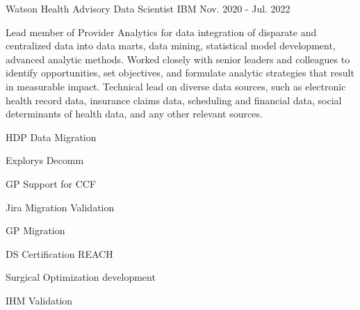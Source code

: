 \begin{cventries}
  \cventry
    {Watson Health} %
    {Advisory Data Scientist}
    {IBM}
    {Nov. 2020 - Jul. 2022}
    {
      \begin{cvparagraph}
        Lead member of Provider Analytics for data integration of disparate and centralized data into data marts, data mining, statistical model development, advanced analytic methods.  Worked closely with senior leaders and colleagues to identify opportunities, set objectives, and formulate analytic strategies that result in measurable impact.  Technical lead on diverse data sources, such as electronic health record data, insurance claims data, scheduling and financial data, social determinants of health data, and any other relevant sources.
      \end{cvparagraph}
      \begin{cvitems} %
        \item {HDP Data Migration}
        \item {Explorys Decomm}
        \item {GP Support for CCF}
        \item {Jira Migration Validation}
        \item {GP Migration}
        \item {DS Certification REACH}
        \item {Surgical Optimization development}
        \item {IHM Validation}
      \end{cvitems}
    }


\end{cventries}
